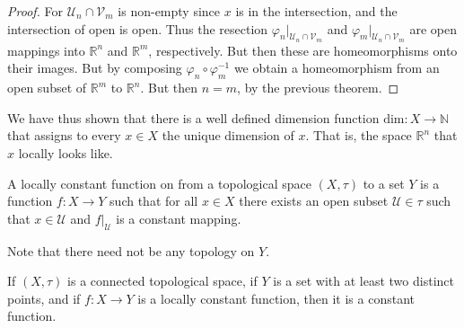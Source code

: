         \begin{proof} 
            For $\mathcal{U}_{n}\cap\mathcal{V}_{m}$ is non-empty since $x$ is
            in the intersection, and the intersection of open is open. Thus the
            resection $\varphi_{n}|_{\mathcal{U}_{n}\cap\mathcal{V}_{m}}$ and
            $\varphi_{m}|_{\mathcal{U}_{n}\cap\mathcal{V}_{m}}$ are open
            mappings into $\mathbb{R}^{n}$ and $\mathbb{R}^{m}$, respectively.
            But then these are homeomorphisms onto their images. But by
            composing $\varphi_{n}\circ\varphi_{m}^{\minus{1}}$ we obtain a
            homeomorphism from an open subset of $\mathbb{R}^{m}$ to
            $\mathbb{R}^{n}$. But then $n=m$, by the previous theorem.
        \end{proof}
        We have thus shown that there is a well defined dimension function
        $\textrm{dim}:X\rightarrow\mathbb{N}$ that assigns to every $x\in{X}$
        the unique dimension of $x$. That is, the space $\mathbb{R}^{n}$ that
        $x$ locally looks like.
        \begin{definition}
            A locally constant function on from a topological space $(X,\tau)$
            to a set $Y$ is a function $f:X\rightarrow{Y}$ such that for all
            $x\in{X}$ there exists an open subset $\mathcal{U}\in\tau$ such that
            $x\in\mathcal{U}$ and $f|_{\mathcal{U}}$ is a constant mapping.
        \end{definition}
        Note that there need not be any topology on $Y$.
        \begin{theorem}
            If $(X,\tau)$ is a connected topological space, if $Y$ is a set with
            at least two distinct points, and if $f:X\rightarrow{Y}$ is a
            locally constant function, then it is a constant function.
        \end{theorem}
